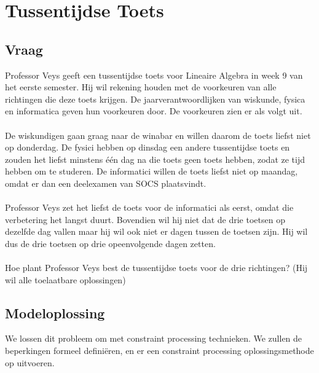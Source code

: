 \documentclass[alternative-exam.tex]{subfiles}
\begin{document}
\chapter{Tussentijdse Toets}

\section{Vraag}
Professor Veys geeft een tussentijdse toets voor Lineaire Algebra in week 9 van het eerste semester.
Hij wil rekening houden met de voorkeuren van alle richtingen die deze toets krijgen. De jaarverantwoordlijken van wiskunde, fysica en informatica geven hun voorkeuren door. De voorkeuren zien er als volgt uit.\\\\
De wiskundigen gaan graag naar de winabar en willen daarom de toets liefst niet op donderdag. De fysici hebben op dinsdag een andere tussentijdse toets en zouden het liefst minstens één dag na die toets geen toets hebben, zodat ze tijd hebben om te studeren. De informatici willen de toets liefst niet op maandag, omdat er dan een deelexamen van SOCS plaatsvindt.\\\\
Professor Veys zet het liefst de toets voor de informatici als eerst, omdat die verbetering het langst duurt. Bovendien wil hij niet dat de drie toetsen op dezelfde dag vallen maar hij wil ook niet er dagen tussen de toetsen zijn. Hij wil dus de drie toetsen op drie opeenvolgende dagen zetten.\\\\
Hoe plant Professor Veys best de tussentijdse toets voor de drie richtingen? (Hij wil alle toelaatbare oplossingen)

\section{Modeloplossing}
We lossen dit probleem om met constraint processing technieken. We zullen de beperkingen formeel defini\"eren, en er een constraint processing oplossingsmethode op uitvoeren.
\end{document}
